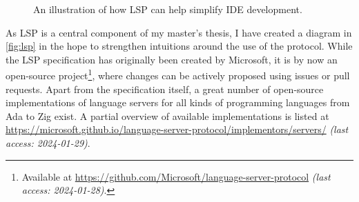 \documentclass{scrartcl}
\newcommand{\web}[2]{\url{#1} \textit{(last access: #2)}}
\begin{document}
\begin{figure}
  \begin{center}
  \end{center}
  \caption{An illustration of how LSP can help simplify IDE development.}\label{fig:lsp}
\end{figure}

\noindent{}As LSP is a central component of my master's thesis, I have created a diagram in \autoref{fig:lsp} in the hope to strengthen intuitions around the use of the protocol.
While the LSP specification has originally been created by Microsoft, it is by now an open-source project\footnote{
  Available at \web{https://github.com/Microsoft/language-server-protocol}{2024-01-28}.
}, where changes can be actively proposed using issues or pull requests.
Apart from the specification itself, a great number of open-source implementations of language servers for all kinds of programming languages from Ada to Zig exist.
A partial overview of available implementations is listed at \web{https://microsoft.github.io/language-server-protocol/implementors/servers/}{2024-01-29}.
\end{document}
